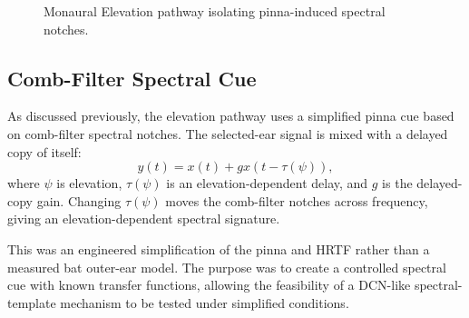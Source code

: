 \begin{figure}[htbp]
    \centering
    \caption{Monaural Elevation pathway isolating pinna-induced spectral notches.}
    \label{fig:elevation_flowchart}
\end{figure}

\subsection{Comb-Filter Spectral Cue}

As discussed previously, the elevation pathway uses a simplified pinna cue based on comb-filter spectral notches. The selected-ear signal is mixed with a delayed copy of itself:
\begin{equation}
    y(t) = x(t) + g x(t-\tau(\psi)),
\end{equation}
where $\psi$ is elevation, $\tau(\psi)$ is an elevation-dependent delay, and $g$ is the delayed-copy gain. Changing $\tau(\psi)$ moves the comb-filter notches across frequency, giving an elevation-dependent spectral signature.

This was an engineered simplification of the pinna and HRTF rather than a measured bat outer-ear model. The purpose was to create a controlled spectral cue with known transfer functions, allowing the feasibility of a DCN-like spectral-template mechanism to be tested under simplified conditions.

